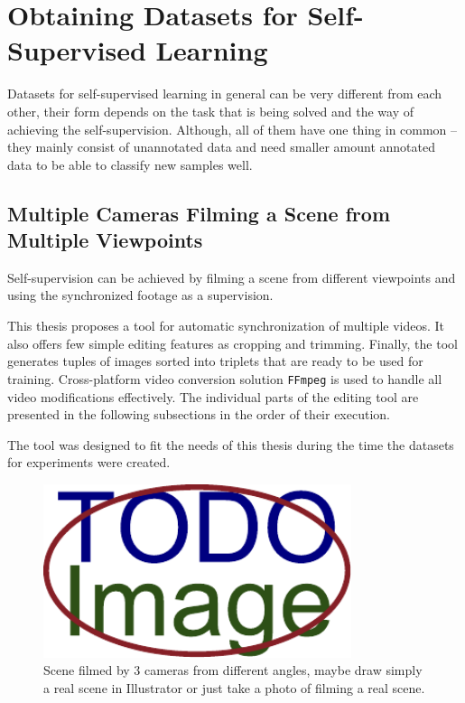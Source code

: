 \chapter{\label{chap:dataset}Obtaining Datasets for Self-Supervised Learning}

Datasets for self-supervised learning in general can be very different from each other, their form depends on the task that is being solved and the way of achieving the self-supervision. Although, all of them have one thing in common -- they mainly consist of unannotated data and need smaller amount annotated data to be able to classify new samples well.

\blindtext

\blindtext

\section{Multiple Cameras Filming a Scene from Multiple Viewpoints}

Self-supervision can be achieved by filming a scene from different viewpoints and using the synchronized footage as a supervision.
\blindtext

This thesis proposes a tool for automatic synchronization of multiple videos. It also offers few simple editing features as cropping and trimming. Finally, the tool generates tuples of images sorted into triplets that are ready to be used for training. Cross-platform video conversion solution \texttt{FFmpeg} is used to handle all video modifications effectively. The individual parts of the editing tool are presented in the following subsections in the order of their execution. 

The tool was designed to fit the needs of this thesis during the time the datasets for experiments were created.
\blindtext

\begin{figure}[ht]\centering
  \centering
  \includegraphics[width=\linewidth,height=2in]{figures/placeholder.pdf}
  \caption{Scene filmed by 3 cameras from different angles, maybe draw simply a real scene in Illustrator or just take a photo of filming a real scene.}
  \label{SceneMultipleCameras}
\end{figure}

